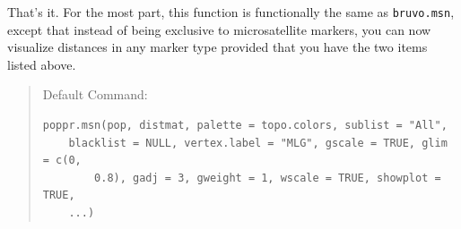 \documentclass[letterpaper]{article}\usepackage[]{graphicx}\usepackage[]{color}
\makeatletter
\newenvironment{kframe}{%
 \def\at@end@of@kframe{}%
 \ifinner\ifhmode%
  \def\at@end@of@kframe{\end{minipage}}%
  \begin{minipage}{\columnwidth}%
 \fi\fi%
 \def\FrameCommand##1{\hskip\@totalleftmargin \hskip-\fboxsep
 \colorbox{shadecolor}{##1}\hskip-\fboxsep
     \hskip-\linewidth \hskip-\@totalleftmargin \hskip\columnwidth}%
 \MakeFramed {\advance\hsize-\width
   \@totalleftmargin\z@ \linewidth\hsize
   \@setminipage}}%
 {\par\unskip\endMakeFramed%
 \at@end@of@kframe}
\newenvironment{knitrout}{}{} %
\newcommand{\tab}{\hspace*{1em}}
\makeatother
\begin{document}
That's it. For the most part, this function is functionally the same as \texttt{bruvo.msn}, except that instead of being exclusive to microsatellite markers, you can now visualize distances in any marker type provided that you have the two items listed above.

\begin{quote}
Default Command:
\begin{knitrout}
\color{fgcolor}\begin{kframe}
\begin{verbatim}
poppr.msn(pop, distmat, palette = topo.colors, sublist = "All", 
    blacklist = NULL, vertex.label = "MLG", gscale = TRUE, glim = c(0, 
        0.8), gadj = 3, gweight = 1, wscale = TRUE, showplot = TRUE, 
    ...)
\end{verbatim}
\end{kframe}
\end{knitrout}

\end{quote}
\end{document}
